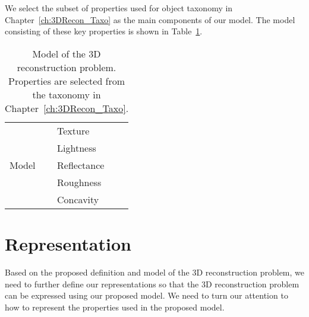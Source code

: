We select the subset of properties used for object taxonomy in Chapter~\ref{ch:3DRecon_Taxo} as the main components of our model. The model consisting of these key properties is shown in Table~\ref{tab:3DRecon_model}.
\begin{table}[!htbp]
  \centering
  \begin{tabular}{l|l}
  \toprule
  \multirow{5}{*}{Model} & Texture\\
  & Lightness\\
  & Reflectance\\
  & Roughness\\
  & Concavity\\
  \bottomrule
  \end{tabular}
  \caption{Model of the 3D reconstruction problem. Properties are selected from the taxonomy in Chapter~\ref{ch:3DRecon_Taxo}.}
  \label{tab:3DRecon_model}
\end{table}



\section{Representation}
\label{sec:3DRecon_Rep}
Based on the proposed definition and model of the 3D reconstruction problem, we need to further define our representations so that the 3D reconstruction problem can be expressed using our proposed model. We need to turn our attention to how to represent the properties used in the proposed model.


